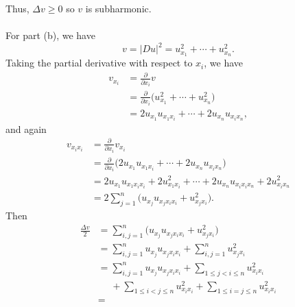 \begin{solution}
  Thus, \(\Delta v\geq 0\) so \(v\) is subharmonic.
  \\\\
  For part (b), we have
  \[
    v=|Du|^2=u_{x_1}^2+\dotsb+u_{x_n}^2.
  \]
  Taking the partial derivative with respect to \(x_i\), we have
  \begin{align*}
    v_{x_i}
    &=\tfrac{\partial}{\partial x_i}v\\
    &=\tfrac{\partial}{\partial x_i}
      \bigl(u_{x_1}^2+\dotsb+u_{x_n}^2\bigr)\\
    &=2u_{x_1}u_{x_1x_i}+\dotsb+2u_{x_n}u_{x_ix_n},
  \end{align*}
  and again
  \begin{align*}
    v_{x_ix_i}
    &=\tfrac{\partial}{\partial x_i}v_{x_i}\\
    &=\tfrac{\partial}{\partial x_i}
      \bigl(2u_{x_1}u_{x_1x_i}+\dotsb+2u_{x_n}u_{x_ix_n}\bigr)\\
    &=2u_{x_1}u_{x_1x_ix_i}+2u_{x_1x_i}^2+\dotsb+2u_{x_n}u_{x_ix_ix_n}+2u_{x_ix_n}^2\\
    &=2\sum_{j=1}^n\bigl(u_{x_j}u_{x_jx_ix_i}+u_{x_jx_i}^2\bigr).
  \end{align*}
  Then
  \begin{align*}
    \frac{\Delta v}{2}
    &=\sum_{i,j=1}^n\bigl(u_{x_j}u_{x_jx_ix_i}+u_{x_jx_i}^2\bigr)\\
    &=\sum_{i,j=1}^nu_{x_j}u_{x_jx_ix_i}+\sum_{i,j=1}^nu_{x_jx_i}^2\\
    &=\sum_{i,j=1}^nu_{x_j}u_{x_jx_ix_i}
      +\sum_{1\leq j<i\leq n}u_{x_ix_i}^2\\
    &\phantom{{}={}}
      +\sum_{1\leq i<j\leq n}u_{x_ix_i}^2
      +\sum_{1\leq i=j\leq n}u_{x_ix_i}^2\\
    &=
  \end{align*}
\end{solution}

